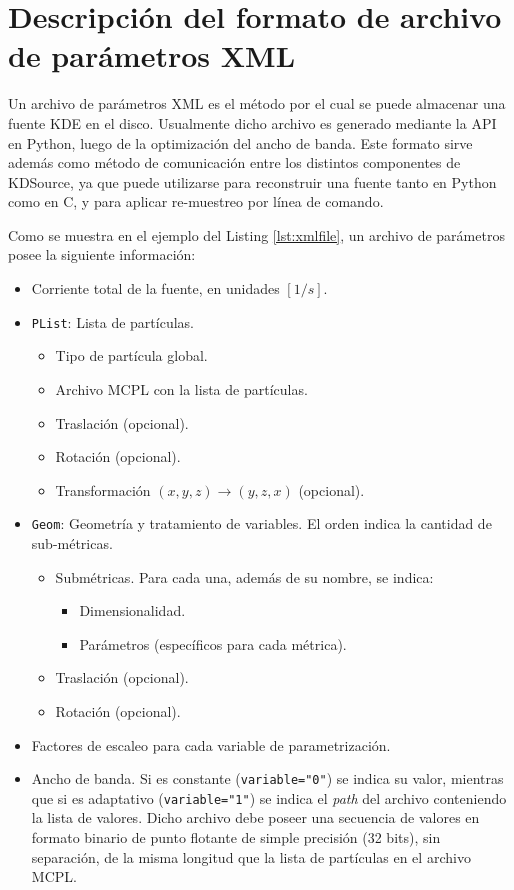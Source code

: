 \section{Descripción del formato de archivo de parámetros XML}

Un archivo de parámetros XML es el método por el cual se puede almacenar una fuente KDE en el disco. Usualmente dicho archivo es generado mediante la API en Python, luego de la optimización del ancho de banda. Este formato sirve además como método de comunicación entre los distintos componentes de KDSource, ya que puede utilizarse para reconstruir una fuente tanto en Python como en C, y para aplicar re-muestreo por línea de comando.

Como se muestra en el ejemplo del Listing \ref{lst:xmlfile}, un archivo de parámetros posee la siguiente información:
\begin{itemize}
	\item Corriente total de la fuente, en unidades $[1/s]$.
	\item \verb|PList|: Lista de partículas.
	\begin{itemize}
		\item Tipo de partícula global.
		\item Archivo MCPL con la lista de partículas.
		\item Traslación (opcional).
		\item Rotación (opcional).
		\item Transformación $(x,y,z)\rightarrow (y,z,x)$ (opcional).
	\end{itemize}
	\item \verb|Geom|: Geometría y tratamiento de variables. El orden indica la cantidad de sub-métricas.
	\begin{itemize}
		\item Submétricas. Para cada una, además de su nombre, se indica:
		\begin{itemize}
			\item Dimensionalidad.
			\item Parámetros (específicos para cada métrica).
		\end{itemize}
		\item Traslación (opcional).
		\item Rotación (opcional).
	\end{itemize}
	\item Factores de escaleo para cada variable de parametrización.
	\item Ancho de banda. Si es constante (\verb|variable="0"|) se indica su valor, mientras que si es adaptativo (\verb|variable="1"|) se indica el \emph{path} del archivo conteniendo la lista de valores. Dicho archivo debe poseer una secuencia de valores en formato binario de punto flotante de simple precisión (32 bits), sin separación, de la misma longitud que la lista de partículas en el archivo MCPL.
\end{itemize}

